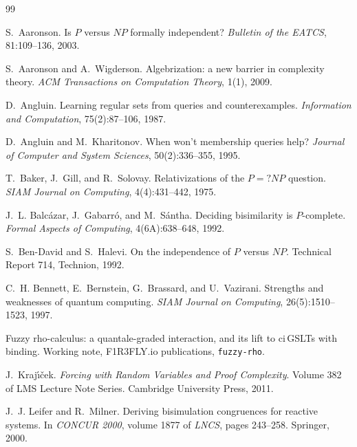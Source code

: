 \documentclass[11pt]{article}
\theoremstyle{definition}
\theoremstyle{plain}
\theoremstyle{remark}
\begin{document}
\begin{thebibliography}{99}

S.~Aaronson.
\newblock Is $P$ versus $NP$ formally independent?
\newblock \emph{Bulletin of the EATCS}, 81:109--136, 2003.

S.~Aaronson and A.~Wigderson.
\newblock Algebrization: a new barrier in complexity theory.
\newblock \emph{ACM Transactions on Computation Theory}, 1(1), 2009.

D.~Angluin.
\newblock Learning regular sets from queries and counterexamples.
\newblock \emph{Information and Computation}, 75(2):87--106, 1987.

D.~Angluin and M.~Kharitonov.
\newblock When won't membership queries help?
\newblock \emph{Journal of Computer and System Sciences}, 50(2):336--355,
1995.

T.~Baker, J.~Gill, and R.~Solovay.
\newblock Relativizations of the $P =? NP$ question.
\newblock \emph{SIAM Journal on Computing}, 4(4):431--442, 1975.

J.~L. Balc\'azar, J.~Gabarr\'o, and M.~S\'antha.
\newblock Deciding bisimilarity is $P$-complete.
\newblock \emph{Formal Aspects of Computing}, 4(6A):638--648, 1992.

S.~Ben-David and S.~Halevi.
\newblock On the independence of $P$ versus $NP$.
\newblock Technical Report 714, Technion, 1992.

C.~H. Bennett, E.~Bernstein, G.~Brassard, and U.~Vazirani.
\newblock Strengths and weaknesses of quantum computing.
\newblock \emph{SIAM Journal on Computing}, 26(5):1510--1523, 1997.

Fuzzy rho-calculus: a quantale-graded interaction, and its lift to
ci\,GSLTs with binding.
\newblock Working note, F1R3FLY.io publications, \texttt{fuzzy-rho}.

J.~Kraj\'{\i}\v{c}ek.
\newblock \emph{Forcing with Random Variables and Proof Complexity}.
\newblock Volume 382 of LMS Lecture Note Series. Cambridge University
Press, 2011.

J.~J. Leifer and R.~Milner.
\newblock Deriving bisimulation congruences for reactive systems.
\newblock In \emph{CONCUR 2000}, volume 1877 of \emph{LNCS}, pages
243--258. Springer, 2000.


\end{thebibliography}
\end{document}
